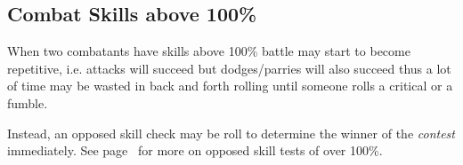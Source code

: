 



\subsection{Combat Skills above 100\%}
When two combatants have skills above 100\% battle may start to become repetitive, i.e. attacks will succeed but dodges/parries will also succeed thus a lot of time may be wasted in back and forth rolling until someone rolls a critical or a fumble.

Instead, an opposed skill check may be roll to determine the winner of the \emph{contest} immediately. See page~\pageref{ssec:opposed-tests-over-100} for more on opposed skill tests of over 100\%.


